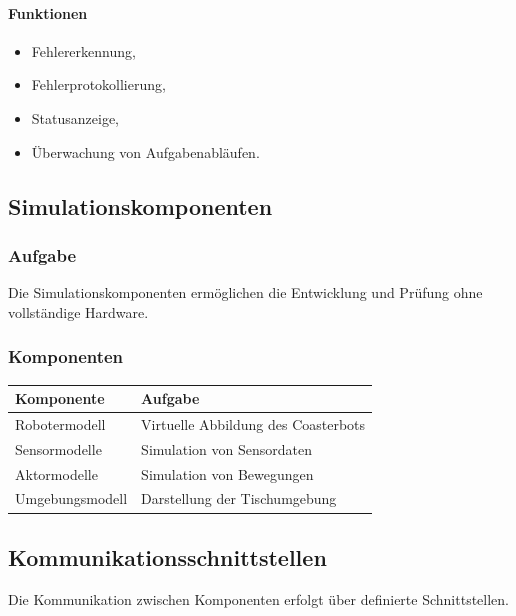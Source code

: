 \documentclass[
  a4paper,
  12pt,
  DIV=12,        %
  parskip=half,  %
  headings=small %
]{scrartcl}
\theoremstyle{definition}
\providecommand{\tightlist}{%
  \setlength{\itemsep}{0pt}\setlength{\parskip}{0pt}}
\theoremstyle{definition}
\begin{document}
\paragraph{Funktionen}\label{funktionen-4}

\begin{itemize}
\tightlist
\item
  Fehlererkennung,
\item
  Fehlerprotokollierung,
\item
  Statusanzeige,
\item
  Überwachung von Aufgabenabläufen.
\end{itemize}

\subsection{Simulationskomponenten}\label{simulationskomponenten}

\subsubsection{Aufgabe}\label{aufgabe-11}

Die Simulationskomponenten ermöglichen die Entwicklung und Prüfung ohne
vollständige Hardware.

\subsubsection{Komponenten}\label{komponenten-2}

\begin{longtable}[]{@{}ll@{}}
\toprule\noalign{}
Komponente & Aufgabe \\
\midrule\noalign{}
\endhead
\bottomrule\noalign{}
\endlastfoot
Robotermodell & Virtuelle Abbildung des Coasterbots \\
Sensormodelle & Simulation von Sensordaten \\
Aktormodelle & Simulation von Bewegungen \\
Umgebungsmodell & Darstellung der Tischumgebung \\
\end{longtable}

\subsection{Kommunikationsschnittstellen}\label{kommunikationsschnittstellen}

Die Kommunikation zwischen Komponenten erfolgt über definierte
Schnittstellen.
\end{document}

